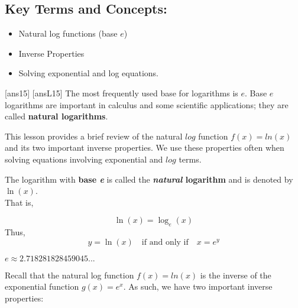 \begin{framed}
\subsection*{Key Terms and Concepts:} 

\begin{multicols}{2}
\begin{itemize}
    \item Natural log functions (base $e$)
    \item Inverse Properties
    \item Solving exponential and log equations.
\end{itemize}
\end{multicols}
\end{framed}
\newpage
[ans15]
[ansL15]
\noindent The most frequently used base for logarithms is $e$. Base $e$ logarithms are important in calculus and some scientific applications; they are called \textbf{natural logarithms}. 

\noindent This lesson provides a brief review of the natural $log$ function $f(x)=ln(x)$ and  its two important inverse properties. We use these properties often when solving equations involving exponential and $log$ terms.
\begin{tcolorbox}[title = {Definition of The Natural Logarithms}]
The logarithm with \textbf{base \textit{e}} is called the \textbf{\textit{natural} logarithm} and is denoted by $\ln (x)$.\\ That is,

$$\ln(x) = \log_e (x)$$ 
Thus, 
$$ y= \ln(x)\quad \text{if and only if}\quad  x = e^y$$

$e \approx 2.718281828459045...$
\end{tcolorbox}
\noindent Recall that the natural log function $f(x)=ln(x)$  is the inverse of the exponential function $g(x)=e^x$.  As such, we have two important inverse properties:    

